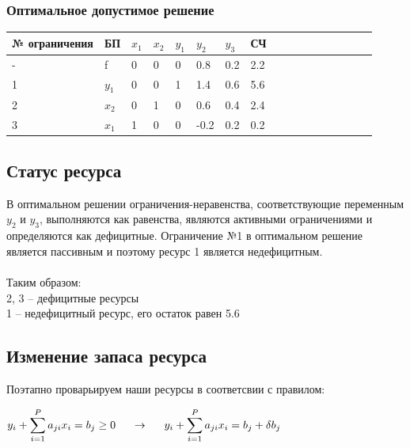 \documentclass[14pt,a4paper,fleqn]{extarticle}
\begin{document}
\subsubsection*{Оптимальное допустимое решение}
\begin{tabularx}{\textwidth}{V{1}p{3.15cm}V{1}p{1.2cm}V{1}p{1.2cm}V{1}p{1.2cm}V{1}p{1.26cm}V{1}p{1.2cm}V{1}p{1.2cm}V{1}p{1.2cm}V{1}}
	\hline
	\small № ограничения & БП & $x_1$ & $x_2$ & $y_1$ & $y_2$ & $y_3$ & СЧ\\
	\hline
	- & f & 0 & 0 & 0 & 0.8 & 0.2 & 2.2\\
	 & $y_1$ & 0 & 0 & 1 & 1.4 & 0.6 & 5.6\\
	 & $x_2$ & 0 & 1 & 0 & 0.6 & 0.4 & 2.4\\
	 & $x_1$ & 1 & 0 & 0 & -0.2 & 0.2 & 0.2\\
	\hline
\end{tabularx}
\subsection*{Статус ресурса}
В оптимальном решении ограничения-неравенства, соответствующие переменным $y_2$ и $y_3$, выполняются как равенства, являются активными ограничениями и определяются как дефицитные. Ограничение №1 в оптимальном решение является пассивным и поэтому ресурс 1 является недефицитным.\\\\
Таким образом:\\
2, 3 -- дефицитные ресурсы\\
1 -- недефицитный ресурс, его остаток равен 5.6
\subsection*{Изменение запаса ресурса}
Поэтапно проварьируем наши ресурсы в соответсвии с правилом:
\begin{center}
	$y_i + \smashoperator[r]{\sum_{i=1}^{P}} a_{ji} x_i = b_j \geq 0 \hspace*{0.5cm} \rightarrow \hspace*{0.5cm} y_i + \smashoperator[r]{\sum_{i=1}^{P}} a_{ji} x_i = b_j + \delta b_j$
\end{center}
\newpage
\end{document}
